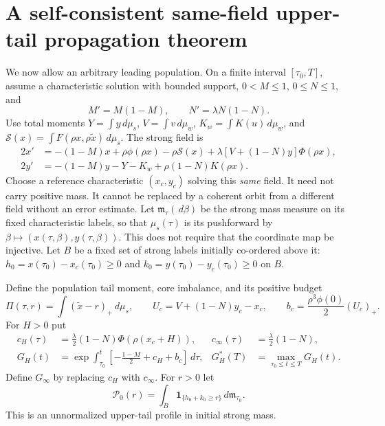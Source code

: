 \documentclass[11pt]{article}
\numberwithin{equation}{section}
\theoremstyle{remark}\newtheorem{remark}[theorem]{Remark}
\newcommand{\dd}{\,d}
\newcommand{\1}{\mathbf 1}
\begin{document}
\section{A self-consistent same-field upper-tail propagation theorem}
\label{inc:AN02:tail:v1:fulltail}
We now allow an arbitrary leading population. On a finite interval
$[\tau_0,T]$, assume a characteristic solution with bounded support,
$0<M\le1$, $0\le N\le1$, and
\[
 M'=M(1-M),\qquad N'=\lambda N(1-N).
\]
Use total moments $Y=\int y\dd\mu_s$, $V=\int v\dd\mu_w$,
$K_w=\int K(u)\dd\mu_w$, and
$\mathcal S(x)=\int F(\rho x,\rho\widetilde x)\dd\mu_s$.
The strong field is
\begin{align}
 2x'&=-(1-M)x+\rho\phi(\rho x)-\rho\mathcal S(x)
 +\lambda[V+(1-N)y]\Phi(\rho x),\label{inc:AN02:tail:v1:fullstrong}\\
 2y'&=-(1-M)y-Y-K_w+\rho(1-N)K(\rho x).\nonumber
\end{align}
Choose a reference characteristic $(x_c,y_c)$ solving this \emph{same}
field. It need not carry positive mass. It cannot be replaced by a
coherent orbit from a different field without an error estimate.
Let $\mathfrak m_\tau(\dd\beta)$ be the strong mass measure on its fixed
characteristic labels, so that $\mu_s(\tau)$ is its pushforward by
$\beta\mapsto(x(\tau,\beta),y(\tau,\beta))$. This does not require
that the coordinate map be injective.
Let $B$ be a fixed set of strong labels initially co-ordered above it:
$h_0=x(\tau_0)-x_c(\tau_0)\ge0$ and
$k_0=y(\tau_0)-y_c(\tau_0)\ge0$ on $B$.

Define the population tail moment, core imbalance, and its positive budget
\begin{equation}\label{inc:AN02:tail:v1:tailbudget}
 \Pi(\tau,r)=\int(\widetilde x-r)_+\dd\mu_s,\qquad
 U_c=V+(1-N)y_c-x_c,\qquad
 b_c=\frac{\rho^3\phi(0)}2(U_c)_+.
\end{equation}
For $H>0$ put
\begin{align}
 c_H(\tau)&=\frac\lambda2(1-N)\Phi(\rho(x_c+H)),&
 c_\infty(\tau)&=\frac\lambda2(1-N),\label{inc:AN02:tail:v1:cH}\\
 G_H(t)&=\exp\int_{\tau_0}^t
 \left[-\frac{1-M}2+c_H+b_c\right]\dd\tau,&
 G_H^*(T)&=\max_{\tau_0\le t\le T}G_H(t).\nonumber
\end{align}
Define $G_\infty$ by replacing $c_H$ with $c_\infty$.
For $r>0$ let
\[
 \mathcal P_0(r)=\int_B\1_{\{h_0+k_0\ge r\}}\dd\mathfrak m_{\tau_0}.
\]
This is an unnormalized upper-tail profile in initial strong mass.
\end{document}
